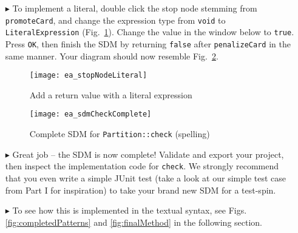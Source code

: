\begin{itemize}
\vspace{0.5cm}

\item[$\blacktriangleright$] To implement a literal, double click the stop node stemming from  \texttt{promoteCard}, and change the expression type from
\texttt{void} to \texttt{LiteralEx\-pression} (Fig.~\ref{fig:sdm_check_literal_exp}). Change the value in the window below to \texttt{true}. Press \texttt{OK},
then finish the SDM by returning \texttt{false} after \texttt{penalizeCard} in the same manner. Your diagram should now resemble
Fig.~\ref{fig:sdm_check_finish}.

\begin{figure}[htbp]
\begin{center}
  \texttt{[image: ea\_stopNodeLiteral]}
  \caption{Add a return value with a literal expression}
  \label{fig:sdm_check_literal_exp}
\end{center}
\end{figure}

\begin{figure}[htbp]
\begin{center}
  \texttt{[image: ea\_sdmCheckComplete]}
  \caption{Complete SDM for \texttt{Partition::check} \update(spelling)}
  \label{fig:sdm_check_finish}
\end{center}
\end{figure}

\clearpage

\item[$\blacktriangleright$] Great job -- the SDM is now complete! Validate and export your project, then inspect the implementation code for \texttt{check}. We
strongly recommend that you even write a simple JUnit test (take a look at our simple test case from Part I for inspiration) to take your brand new SDM for a
test-spin.

\item[$\blacktriangleright$] To see how this is implemented in the textual syntax, see Figs. \ref{fig:completedPatterns} and \ref{fig:finalMethod} in the
following section.


\end{itemize}

